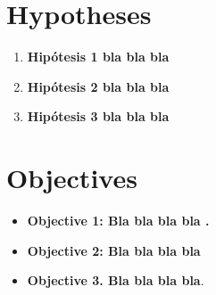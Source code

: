 
\section{Hypotheses}

\lipsum[1-1]


\begin{enumerate}[label=(\alph*)]

 \item  \textbf{Hipótesis 1 bla bla bla}

 \item \textbf{Hipótesis 2  bla bla bla}

 \item \textbf{Hipótesis 3  bla bla bla}

\end{enumerate}


\newpage


\section{Objectives}

\lipsum[1-1]

\begin{itemize}

\item \textbf{Objective 1: Bla bla bla bla .}  

\lipsum[1-1]

\item \textbf{Objective 2: Bla bla bla bla}  
 
\lipsum[1-1]

\item \textbf{Objective 3. Bla bla bla bla}. 

\lipsum[1-1]


\end{itemize}



